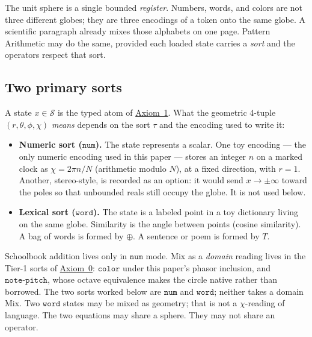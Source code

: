 \documentclass[12pt, a4paper]{article}
\begin{document}
The unit sphere is a single bounded \emph{register}.
Numbers, words, and colors are not three different globes; they are
three encodings of a token onto the same globe. A scientific paragraph
already mixes those alphabets on one page. Pattern Arithmetic may do
the same, provided each loaded state carries a \emph{sort} and the
operators respect that sort.

\subsection{Two primary sorts}
\label{subsec:sorts}
A state $x\in\mathcal{S}$ is the typed atom of
\hyperref[subsec:axiom1]{Axiom~1}. What the geometric 4-tuple
$(r,\theta,\phi,\chi)$ \emph{means} depends on the sort $\tau$ and the
encoding used to write it:
\begin{itemize}
    \item \textbf{Numeric sort ($\mathtt{num}$).}
          The state represents a scalar. One toy encoding --- the only
          numeric encoding used in this paper --- stores an
          integer $n$ on a marked clock as
          $\chi = 2\pi n/N$ (arithmetic modulo $N$), at a fixed
          direction, with $r=1$.
          Another, stereo-style, is recorded as an option: it would
          send $x\to\pm\infty$ toward the
          poles so that unbounded reals still occupy the globe. It is
          not used below.
    \item \textbf{Lexical sort ($\mathtt{word}$).}
          The state is a labeled point in a toy dictionary living on
          the same globe. Similarity is the angle between points
          (cosine similarity). A bag of words is formed by $\oplus$.
          A sentence or poem is formed by $T$.
\end{itemize}
Schoolbook addition lives only in $\mathtt{num}$ mode.
Mix as a \emph{domain} reading lives in the Tier-1 sorts of
\hyperref[subsec:axiom0_admissibility]{Axiom~0}: $\mathtt{color}$ under this
paper's phasor inclusion, and $\mathtt{note\text{-}pitch}$, whose
octave equivalence makes the circle native rather than borrowed.
The two sorts worked below are $\mathtt{num}$ and $\mathtt{word}$;
neither takes a domain Mix.
Two $\mathtt{word}$ states may be mixed as geometry; that is not a
$\chi$-reading of language. The two equations may share a sphere.
They may not share an operator.
\end{document}
